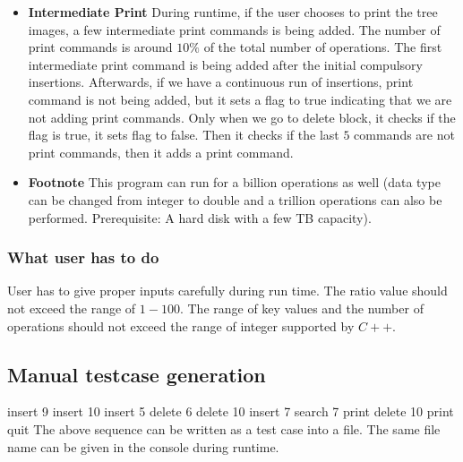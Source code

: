\documentclass{article}
\begin{document}
\begin{itemize}
	\item \textbf{Intermediate Print}\newline
	During runtime, if the user chooses to print the tree images, a few intermediate print commands is being added. The number of print commands is around $10\%$ of the total number of operations. The first intermediate print command is being added after the initial compulsory insertions. Afterwards, if we have a continuous run of insertions, print command is not being added, but it sets a flag to true indicating that we are not adding print commands. Only when we go to delete block, it checks if the flag is true, it sets flag to false. Then it checks if the last $5$ commands are not print commands, then it adds a print command.
	\item \textbf{Footnote}\newline
	This program can run for a billion operations as well (data type can be changed from integer to double and a trillion operations can also be performed. Prerequisite: A hard disk with a few TB capacity).
\end{itemize}
\subsubsection{What user has to do}
User has to give proper inputs carefully during run time. The ratio value should not exceed the range of $1-100$. The range of key values and the number of operations should not exceed the range of integer supported by $C++$. 

\subsection{Manual testcase generation}
insert 9\newline
insert 10\newline
insert 5\newline
delete 6\newline
delete 10\newline
insert 7\newline
search 7\newline
print\newline
delete 10\newline
print\newline
quit\newline\newline
The above sequence can be written as a test case into a file. The same file name can be given in the console during runtime.
\end{document}
